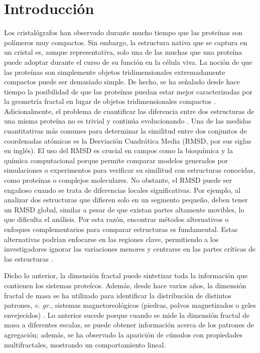 \documentclass[11pt]{article}
\begin{document}
\clearpage

\section{Introducci\'{o}n}

Los cristal\'{o}grafos han observado durante mucho tiempo que las prote\'{i}nas son pol\'{i}meros muy compactos. Sin embargo, la estructura nativa que se captura en un cristal es, aunque representativa, solo  una de las muchas que una prote\'{i}na puede adoptar durante el curso de su funci\'{o}n en la c\'{e}lula viva. La noci\'{o}n de que las prote\'{i}nas son simplemente objetos tridimensionales extremadamente compactos puede ser demasiado simple. De hecho, se ha señalado desde hace tiempo la posibilidad de que las prote\'{i}nas puedan estar mejor caracterizadas por la geometr\'{i}a fractal en lugar de objetos tridimensionales compactos \cite{Enright2005, Dewey1997}. Adicionalmente, el problema de cuantificar las diferencia entre dos estructuras de una misma prote\'{i}na no es trivial y contin\'{u}a evolucionando \cite{Kufareva2012}. Una de las medidas  cuantitativas m\'{a}s comunes para 
determinar la similitud entre dos conjuntos de coordenadas at\'{o}micas 
es la Desviaci\'{o}n Cuadr\'{a}tica Media 
(RMSD, por sus siglas en ingl\'{e}s). El uso del RMSD es crucial en campos como la bioqu\'{i}mica 
y la qu\'{i}mica computacional porque permite comparar modelos generados por 
simulaciones o experimentos para verificar su similitud con estructuras 
conocidas, como prote\'{i}nas o complejos moleculares. 
No obstante, el RMSD puede ser engañoso cuando se trata de diferencias
 locales significativas. Por ejemplo, al analizar dos estructuras que difieren solo 
 en un segmento pequeño, deben tener un RMSD global, similar a pesar de que existan partes
 altamente movibles, lo que dificulta el an\'{a}lisis. Por esta raz\'{o}n, encontrar
  m\'{e}todos alternativos o enfoques complementarios para comparar estructuras 
  es fundamental. Estas alternativas podr\'{i}an enfocarse en las regiones clave,
   permitiendo a los investigadores ignorar las variaciones menores y 
  centrarse en las partes cr\'{i}ticas de las estructuras \cite{Kufareva2012}.

Dicho lo anterior, la dimensi\'{o}n fractal puede sintetizar toda la informaci\'{o}n que contienen los sistemas prote\'{i}cos. Adem\'{a}s, desde hace varios años, la dimensi\'{o}n fractal de masa se ha utilizado para identificar la distribuci\'{o}n de distintos patrones, \textit{v. gr.}, sistemas magnetoreol\'{o}gicos (piedras, polvos magnetizados o geles envejecidos) \cite{Carrillo2003}. Lo anterior sucede porque cuando se mide la dimensi\'{o}n fractal de masa a diferentes escalas, se puede obtener  informaci\'{o}n acerca de los patrones de agregaci\'{o}n; adem\'{a}s, se ha observado la aparici\'{o}n de c\'{u}mulos  con propiedades multifractales, mostrando un comportamiento lineal.
\end{document}

